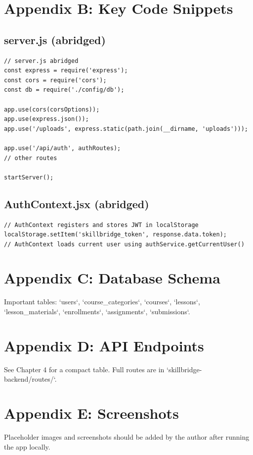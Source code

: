 \documentclass[12pt,a4paper]{report}
\begin{document}
\chapter{Appendix B: Key Code Snippets}
\section{server.js (abridged)}
\begin{lstlisting}
// server.js abridged
const express = require('express');
const cors = require('cors');
const db = require('./config/db');

app.use(cors(corsOptions));
app.use(express.json());
app.use('/uploads', express.static(path.join(__dirname, 'uploads')));

app.use('/api/auth', authRoutes);
// other routes

startServer();
\end{lstlisting}

\section{AuthContext.jsx (abridged)}
\begin{lstlisting}
// AuthContext registers and stores JWT in localStorage
localStorage.setItem('skillbridge_token', response.data.token);
// AuthContext loads current user using authService.getCurrentUser()
\end{lstlisting}

\chapter{Appendix C: Database Schema}
Important tables: `users`, `course_categories`, `courses`, `lessons`, `lesson_materials`, `enrollments`, `assignments`, `submissions`.

\chapter{Appendix D: API Endpoints}
See Chapter 4 for a compact table. Full routes are in `skillbridge-backend/routes/`.

\chapter{Appendix E: Screenshots}
Placeholder images and screenshots should be added by the author after running the app locally.
\end{document}
